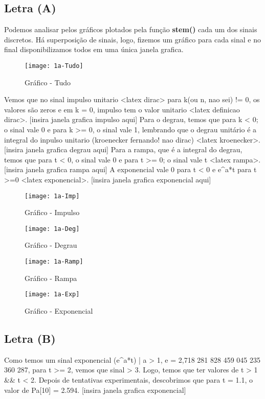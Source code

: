 \documentclass[12pt,a4paper]{report}
\begin{document}
	\subsection{Letra (A)}
	 Podemos analisar pelos gráficos plotados pela função \textbf{stem()} cada um dos sinais discretos. Há superposição de sinais, logo, fizemos um gráfico para cada sinal e no final disponibilizamos todos em uma única janela grafica.
	 \begin{figure}[!ht]
		\centering
		\texttt{[image: 1a-Tudo]}
		\caption{Gráfico - Tudo}
	\end{figure}
 	Vemos que no sinal impulso unitario <latex dirac> para k(ou n, nao sei) != 0, os valores são zeros e em k = 0, impulso tem o valor unitario  <latex definicao dirac>. [insira janela grafica impulso aqui]
 	Para o degrau, temos que para k < 0; o sinal vale 0 e para k >= 0, o sinal vale 1, lembrando que o degrau unitário é a integral do inpulso unitario (kroenecker fernando! nao dirac) <latex kroenecker>. [insira janela grafica degrau aqui]
	Para a rampa, que é a integral do degrau, temos que para t < 0, o sinal vale 0 e para t >= 0; o sinal vale t <latex rampa>. [insira janela grafica rampa aqui]
	A exponencial vale 0 para t < 0 e e^a*t para t >=0 <latex exponencial>. [insira janela grafica exponencial aqui]
			\begin{figure}[!ht]
				\centering
				\texttt{[image: 1a-Imp]}
				\caption{Gráfico - Impulso}
			\end{figure}
			\newpage

			\begin{figure}[!ht]
				\centering
				\texttt{[image: 1a-Deg]}
				\caption{Gráfico - Degrau}
			\end{figure}

			\begin{figure}[!ht]
				\centering
				\texttt{[image: 1a-Ramp]}
				\caption{Gráfico - Rampa}
			\end{figure}
			\newpage

			\begin{figure}[!ht]
				\centering
				\texttt{[image: 1a-Exp]}
				\caption{Gráfico - Exponencial}
			\end{figure}
			\newpage
	
	\subsection{Letra (B)}
	Como temos um sinal exponencial (e^a*t) | a > 1, e = 2,718 281 828 459 045 235 360 287, para t >= 2, vemos que sinal > 3. Logo, temos que ter valores de t > 1 && t < 2. Depois de tentativas experimentais, descobrimos que para t = 1.1, o valor de Pa[10] = 2.594. [insira janela grafica exponencial]
	
\end{document}
